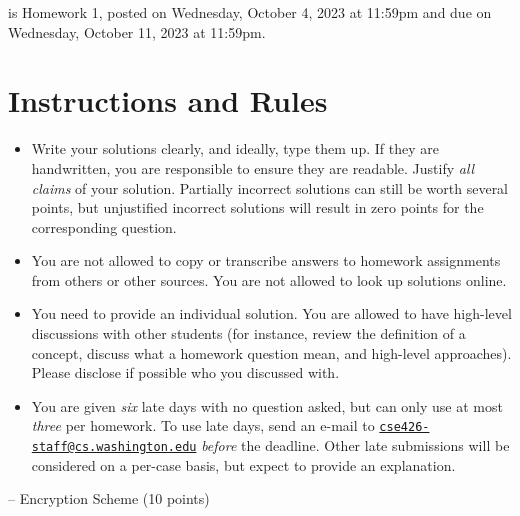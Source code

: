 \documentclass{homework}
\begin{document}
\This is Homework 1,
posted on Wednesday, October 4, 2023 at 11:59pm
and due on Wednesday,  October 11, 2023 at 11:59pm.

\section*{Instructions and Rules}
\begin{itemize}
\item Write your solutions clearly, and ideally, type them up.
If they are handwritten, you are responsible to ensure they are readable.
Justify \emph{all claims} of your solution.
Partially incorrect solutions can still be worth several points,
but unjustified incorrect solutions will result in zero points for the corresponding question.
\item You are not allowed to copy or transcribe answers to homework assignments from others or other sources. You are not allowed to look up solutions online.
\item You need to provide an individual solution.
You are allowed to have high-level discussions with other students
(for instance, review the definition of a concept,
discuss what a homework question mean, and
high-level approaches).
Please disclose if possible who you discussed with.
\item You are given \emph{six} late days with no question asked,
but can only use at most \emph{three} per homework.
To use late days, send an e-mail to
\href{mailto:cse426-staff@cs.washington.edu}%
{\texttt{\small cse426-staff@cs.washington.edu}}
\emph{before} the deadline.
Other late submissions will be considered on a per-case basis,
but expect to provide an explanation.
\end{itemize}

 -- Encryption Scheme (10 points)
\end{document}
